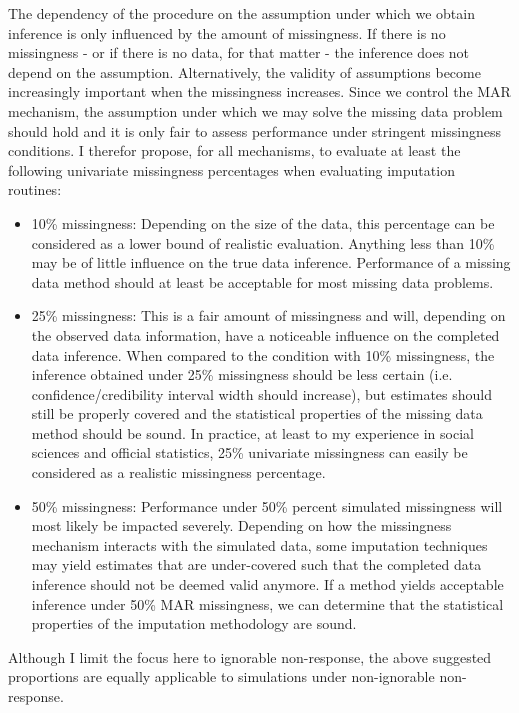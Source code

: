 \documentclass[bimj,fleqn]{w-art}
\theoremstyle{plain}
\theoremstyle{definition}
\begin{document}
The dependency of the procedure on the assumption under which we obtain inference is only influenced by the amount of missingness. If there is no missingness - or if there is no data, for that matter - the inference does not depend on the assumption. Alternatively, the validity of assumptions become increasingly important when the missingness increases. Since we control the MAR mechanism, the assumption under which we may solve the missing data problem should hold and it is only fair to assess performance under stringent missingness conditions. I therefor propose, for all mechanisms, to evaluate at least the following univariate missingness percentages when evaluating imputation routines:

\begin{itemize}
  \item 10\% missingness: Depending on the size of the data, this percentage can be considered as a lower bound of realistic evaluation. Anything less than 10\% may be of little influence on the true data inference. Performance of a missing data method should at least be acceptable for most missing data problems. 
  \item 25\% missingness: This is a fair amount of missingness and will, depending on the observed data information, have a noticeable influence on the completed data inference. When compared to the condition with 10\% missingness, the inference obtained under 25\% missingness should be less certain (i.e. confidence/credibility interval width should increase), but estimates should still be properly covered and the statistical properties of the missing data method should be sound. In practice, at least to my experience in social sciences and official statistics, 25\% univariate missingness can easily be considered as a realistic missingness percentage. 
  \item 50\% missingness: Performance under 50\% percent simulated missingness will most likely be impacted severely. Depending on how the missingness mechanism interacts with the simulated data, some imputation techniques may yield estimates that are under-covered such that the completed data inference should not be deemed valid anymore. If a method yields acceptable inference under 50\% MAR missingness, we can determine that the statistical properties of the imputation methodology are sound. 
\end{itemize}
Although I limit the focus here to ignorable non-response, the above suggested proportions are equally applicable to simulations under non-ignorable non-response.
\end{document}
